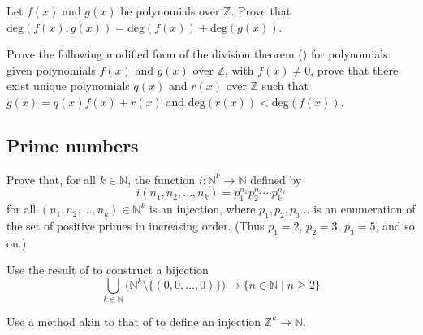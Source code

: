 \begin{chapex}
Let $f(x)$ and $g(x)$ be polynomials over $\mathbb{Z}$. Prove that $\mathrm{deg}(f(x),g(x)) = \mathrm{deg}(f(x)) + \mathrm{deg}(g(x))$.
\end{chapex}

\begin{chapex}
Prove the following modified form of the division theorem () for polynomials: given polynomials $f(x)$ and $g(x)$ over $\mathbb{Z}$, with $f(x) \ne 0$, prove that there exist unique polynomials $q(x)$ and $r(x)$ over $\mathbb{Z}$ such that $g(x) = q(x)f(x) + r(x)$ and $\mathrm{deg}(r(x)) < \mathrm{deg}(f(x))$.
\end{chapex}

\subsection*{Prime numbers}

\begin{chapex}
Prove that, for all $k \in \mathbb{N}$, the function $i : \mathbb{N}^k \to \mathbb{N}$ defined by
\[ i(n_1,n_2,\dots,n_k) = p_1^{n_1} p_2^{n_2} \cdots p_k^{n_k} \]
for all $(n_1,n_2,\dots,n_k) \in \mathbb{N}^k$ is an injection, where $p_1, p_2, p_3 \dots$ is an enumeration of the set of positive primes in increasing order. (Thus $p_1=2$, $p_2=3$, $p_3=5$, and so on.)
\end{chapex}

\begin{chapex}
Use the result of  to construct a bijection
\[ \bigcup_{k \in \mathbb{N}} \Big( \mathbb{N}^k \setminus \{ (0,0,\dots,0) \} \Big) \to \{ n \in \mathbb{N} \mid n \ge 2 \} \]
\end{chapex}

\begin{chapex}
Use a method akin to that of  to define an injection $\mathbb{Z}^k \to \mathbb{N}$.
\end{chapex}

